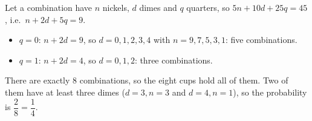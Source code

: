 Let a combination have $n$ nickels, $d$ dimes and $q$ quarters, so $5n+10d+25q=45$, i.e.\ $n+2d+5q=9$.
\begin{itemize}
\item $q=0$: $n+2d=9$, so $d=0,1,2,3,4$ with $n=9,7,5,3,1$: five combinations.
\item $q=1$: $n+2d=4$, so $d=0,1,2$: three combinations.
\end{itemize}
There are exactly $8$ combinations, so the eight cups hold all of them. Two of them have at least three dimes ($d=3,n=3$ and $d=4,n=1$), so the probability is $\dfrac{2}{8}=\boxed{\dfrac{1}{4}}$.
